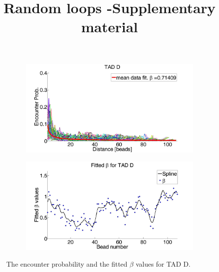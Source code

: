 \documentclass[12pt]{article}
\begin{document}
\title{Random loops -Supplementary material}

\begin{figure}[H]
 \begin{subfigure}[b]{0.3\textwidth}
 \includegraphics[scale=0.2]{meanDataFitTADD}
 \caption{}
 \end{subfigure}
 
 \begin{subfigure}[b]{0.3\textwidth}
\includegraphics[scale=0.2]{fittedExpValuesWithSplineAverageTADD}
\caption{}
 \end{subfigure}
\caption{The encounter probability and the fitted $\beta$ values for TAD D.}
\end{figure}
\end{document}

